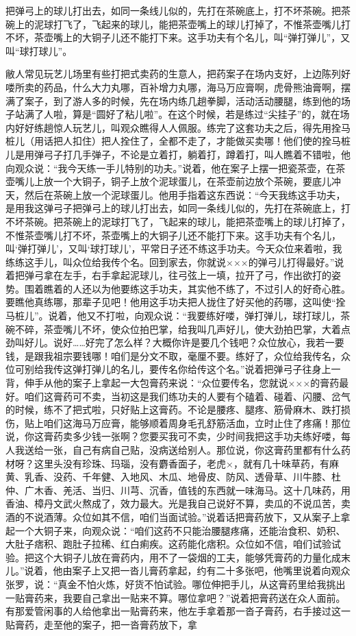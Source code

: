 \documentclass[12pt,UTF8]{ctexbook}
\begin{document}
把弹弓上的球儿打出去，如同一条线儿似的，先打在茶碗底上，打不坏茶碗。把茶碗上的泥球打飞了，飞起来的球儿，能把茶壶嘴上的球儿打掉了，不惟茶壶嘴儿打不坏，茶壶嘴上的大铜子儿还不能打下来。这手功夫有个名儿，叫“弹打弹儿”，又叫“球打球儿”。



敝人常见玩艺儿场里有些打把式卖药的生意人，把药案子在场内支好，上边陈列好喽所卖的药品，什么大力丸哪，百补增力丸哪，海马万应膏啊，虎骨熊油膏啊，摆满了案子，到了游人多的时候，先在场内练几趟拳脚，活动活动腰腿，练到他的场子站满了人啦，算是“圆好了粘儿啦”。在这个时候，若是练过“尖挂子”的，就在场内好好练趟惊人玩艺儿，叫观众瞧得人人佩服。练完了这套功夫之后，得先用拴马桩儿（用话把人扣住）把人拴住了，全都不走了，才能做买卖哪！他们使的拴马桩儿是用弹弓子打几手弹子，不论是立着打，躺着打，蹲着打，叫人瞧着不错啦，他向观众说：“我今天练一手儿特别的功夫。”说着，他在案子上摆一把瓷茶壶，在茶壶嘴儿上放一个大铜子，铜子上放个泥球蛋儿，在茶壶前边放个茶碗，要底儿冲天，然后在茶碗上放一个泥球蛋儿。他用手指着这东西说：“今天我练这手功夫，是用我这弹弓子把弹弓上的球儿打出去，如同一条线儿似的，先打在茶碗底上，打不坏茶碗。把茶碗上的泥球打飞了，飞起来的球儿，能把茶壶嘴上的球儿打掉了，不惟茶壶嘴儿打不坏，茶壶嘴上的大铜子儿还不能打下来。这手功夫有个名儿，叫‘弹打弹儿’，又叫‘球打球儿’，平常日子还不练这手功夫。今天众位来着啦，我练练这手儿，叫众位给我传个名。回到家去，你就说×××的弹弓儿打得最好。”说着把弹弓拿在左手，右手拿起泥球儿，往弓弦上一填，拉开了弓，作出欲打的姿势。围着瞧着的人还以为他要练这手功夫，其实他不练了，不过引人的好奇心胜。要瞧他真练哪，那辈子见吧！他用这手功夫把人拢住了好买他的药哪，这叫使“拴马桩儿”。说着，他又不打啦，向观众说：“我要练好喽，弹打弹儿，球打球儿，茶碗不碎，茶壶嘴儿不坏，使众位拍巴掌，给我叫几声好儿，使大劲拍巴掌，大着点劲叫好儿。说好……好完了怎么样？大概你许是要几个钱吧？众位放心，我若一要钱，是跟我祖宗要钱哪！咱们是分文不取，毫厘不要。练好了，众位给我传名，众位可别给我传这弹打弹儿的名儿，要传名你给传这个名。”说着把弹弓子往身上一背，伸手从他的案子上拿起一大包膏药来说：“众位要传名，您就说×××的膏药最好。咱们这膏药可不卖，当初这是我们练功夫的人要有个磕着、碰着、闪腰、岔气的时候，练不了把式啦，只好贴上这膏药。不论是腰疼、腿疼、筋骨麻木、跌打损伤，贴上咱们这海马万应膏，能够顺着周身毛孔舒筋活血，立时止住了疼痛！那位说，你这膏药卖多少钱一张啊？您要买我可不卖，少时间我把这手功夫练好喽，每人我送给一张，自己有病自己贴，没病送给别人。那位说，你这膏药里都有什么药材呀？这里头没有珍珠、玛瑙，没有麝香面子，老虎×，就有几十味草药，有麻黄、乳香、没药、千年健、入地风、木瓜、地骨皮、防风、透骨草、川牛膝、杜仲、广木香、羌活、当归、川芎、沉香，值钱的东西就一味海马。这十几味药，用香油、樟丹文武火熬成了，效力最大。光是我自己说好不算，卖瓜的不说瓜苦，卖酒的不说酒薄。众位如其不信，咱们当面试验。”说着话把膏药放下，又从案子上拿起一个大铜子来，向观众说：“咱们这药不只能治腰腿疼痛，还能治食积、奶积、大肚子痞积、跑肚子拉稀、红白痢疾。这药能化痞积。众位如不信，咱们试验试验。把这个大铜子儿放在膏药内，用不了一袋烟的工夫，能够凭膏药的力量化成末儿。”说着，他由案子上又把一沓儿膏药拿起，约有二十多张吧，他嘴里说着向观众张罗，说：“真金不怕火炼，好货不怕试验。哪位伸把手儿，从这膏药里给我挑出一贴膏药来，我要自己拿出一贴来不算。哪位拿吧？”说着把膏药送在众人面前。有那爱管闲事的人给他拿出一贴膏药来，他左手拿着那一沓子膏药，右手接过这一贴膏药，走至他的案子，把一沓膏药放下，拿
\end{document}
